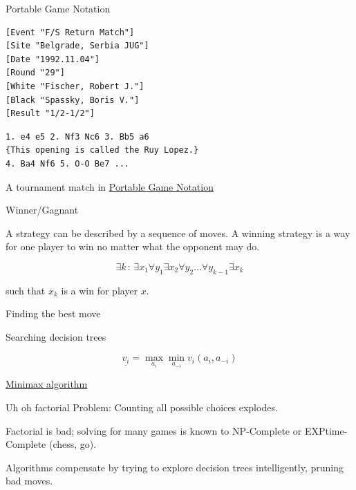 \documentclass[compress]{beamer}
\newcommand{\blue}[1]{\textcolor{NordBlue}{#1}}
\newcommand{\red}[1]{\textcolor{NordRed}{#1}}
\newcommand{\yellow}[1]{\textcolor{NordYellow}{#1}}
\newcommand{\cyan}[1]{\textcolor{NordCyan}{#1}}
\newcommand{\bcyan}[1]{\textcolor{NordBrightCyan}{#1}}
\begin{document}
\begin{frame}[fragile]{Portable Game Notation}

\begin{center}
\yellow{   }
\end{center}

{\tiny
\begin{lstlisting}
[Event "F/S Return Match"]
[Site "Belgrade, Serbia JUG"]
[Date "1992.11.04"]
[Round "29"]
[White "Fischer, Robert J."]
[Black "Spassky, Boris V."]
[Result "1/2-1/2"]
\end{lstlisting} }
\begin{lstlisting}
1. e4 e5 2. Nf3 Nc6 3. Bb5 a6
{This opening is called the Ruy Lopez.}
4. Ba4 Nf6 5. O-O Be7 ...
\end{lstlisting}

\bigskip
\red{   }A tournament match in \cyan{\href{https://en.wikipedia.org/wiki/Portable_Game_Notation}{Portable Game Notation}}
\end{frame}

\begin{frame}{Winner/Gagnant}

A \bcyan{strategy} can be described by a sequence of moves. A \cyan{winning} strategy is a way for one player to win \bcyan{no matter what the opponent may do}.

\medskip

\[\exists k \, : \, \exists x_1 \forall y_1 \exists x_2 \forall y_2 \dots \forall y_{k-1} \exists x_k \]

such that $x_k$ is a win for player $x$.
\end{frame}


\begin{frame}{Finding the best move}


Searching \blue{decision trees}

\bigskip

\[{\underline {v_{i}}}=\max _{a_{i}}\min _{a_{-i}}{v_{i}(a_{i},a_{-i})}\]

\smallskip

\href{https://en.wikipedia.org/wiki/Minimax}{Minimax algorithm}


\end{frame}

\begin{frame}{Uh oh factorial}
\red{Problem}: Counting all possible choices explodes.

\medskip

\red{Factorial} is bad; solving for many games is known to \cyan{NP-Complete} or \bcyan{EXPtime-Complete} (chess, go).

\medskip

Algorithms compensate by trying to explore decision trees intelligently, pruning bad moves.
\end{frame}
\end{document}
